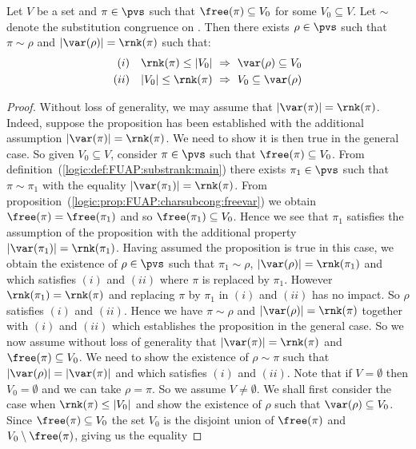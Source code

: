 \begin{prop}\label{logic:prop:FUAP:substrank:changeofvar}
Let $V$ be a set and $\pi\in\pvs$ such that $\free(\pi)\subseteq
V_{0}$ for some $V_{0}\subseteq V$.  Let $\sim$ denote the
substitution congruence on \pvs. Then there exists $\rho\in\pvs$
such that $\pi\sim\rho$ and $|\var(\rho)|=\rnk(\pi)$ such that:
    \begin{eqnarray*}
    (i)&&\rnk(\pi)\leq|V_{0}|\ \Rightarrow\ \var(\rho)\subseteq
    V_{0}\\
    (ii)&&|V_{0}|\leq\rnk(\pi)\ \Rightarrow\
    V_{0}\subseteq\var(\rho)
    \end{eqnarray*}
\end{prop}
\begin{proof}
Without loss of generality, we may assume that
$|\var(\pi)|=\rnk(\pi)$. Indeed, suppose the proposition has been
established with the additional assumption $|\var(\pi)|=\rnk(\pi)$.
We need to show it is then true in the general case. So given
$V_{0}\subseteq V$, consider $\pi\in\pvs$ such that
$\free(\pi)\subseteq V_{0}$. From
definition~(\ref{logic:def:FUAP:substrank:main}) there exists
$\pi_{1}\in\pvs$ such that $\pi\sim\pi_{1}$ with the equality
$|\var(\pi_{1})|=\rnk(\pi)$. From
proposition~(\ref{logic:prop:FUAP:charsubcong:freevar}) we obtain
$\free(\pi)=\free(\pi_{1})$ and so $\free(\pi_{1})\subseteq V_{0}$.
Hence we see that $\pi_{1}$ satisfies the assumption of the
proposition with the additional property
$|\var(\pi_{1})|=\rnk(\pi_{1})$. Having assumed the proposition is
true in this case, we obtain the existence of $\rho\in\pvs$ such
that $\pi_{1}\sim\rho$, $|\var(\rho)|=\rnk(\pi_{1})$ and which
satisfies $(i)$ and $(ii)$ where $\pi$ is replaced by $\pi_{1}$.
However $\rnk(\pi_{1})=\rnk(\pi)$ and replacing $\pi$ by $\pi_{1}$
in $(i)$ and $(ii)$ has no impact. So $\rho$ satisfies $(i)$ and
$(ii)$. Hence we have $\pi\sim\rho$ and $|\var(\rho)|=\rnk(\pi)$
together with $(i)$ and $(ii)$ which establishes the proposition in
the general case. So we now assume without loss of generality that
$|\var(\pi)|=\rnk(\pi)$ and $\free(\pi)\subseteq V_{0}$. We need to
show the existence of $\rho\sim\pi$ such that
$|\var(\rho)|=|\var(\pi)|$ and which satisfies $(i)$ and $(ii)$.
Note that if $V=\emptyset$  then $V_{0}=\emptyset$ and we can take
$\rho=\pi$. So we assume $V\neq\emptyset$. We shall first consider
the case when $\rnk(\pi)\leq |V_{0}|$ and show the existence of
$\rho$ such that $\var(\rho)\subseteq V_{0}$. Since
$\free(\pi)\subseteq V_{0}$ the set $V_{0}$ is the disjoint union of
$\free(\pi)$ and $V_{0}\setminus\free(\pi)$, giving us the equality

\end{proof}
